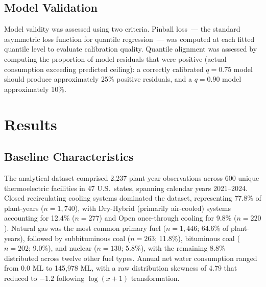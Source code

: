 \documentclass[11pt, letterpaper]{article}
\begin{document}
\subsection{Model Validation}

Model validity was assessed using two criteria. Pinball loss~--- the standard asymmetric loss function for quantile regression~--- was computed at each fitted quantile level to evaluate calibration quality. Quantile alignment was assessed by computing the proportion of model residuals that were positive (actual consumption exceeding predicted ceiling): a correctly calibrated $q = 0.75$ model should produce approximately 25\% positive residuals, and a $q = 0.90$ model approximately 10\%.

\section{Results}

\subsection{Baseline Characteristics}

The analytical dataset comprised 2{,}237 plant-year observations across 600 unique thermoelectric facilities in 47 U.S.\ states, spanning calendar years 2021--2024. Closed recirculating cooling systems dominated the dataset, representing 77.8\% of plant-years ($n = 1{,}740$), with Dry-Hybrid (primarily air-cooled) systems accounting for 12.4\% ($n = 277$) and Open once-through cooling for 9.8\% ($n = 220$). Natural gas was the most common primary fuel ($n = 1{,}446$; 64.6\% of plant-years), followed by subbituminous coal ($n = 263$; 11.8\%), bituminous coal ($n = 202$; 9.0\%), and nuclear ($n = 130$; 5.8\%), with the remaining 8.8\% distributed across twelve other fuel types. Annual net water consumption ranged from 0.0 ML to 145{,}978 ML, with a raw distribution skewness of 4.79 that reduced to $-1.2$ following $\log(x+1)$ transformation.
\end{document}
